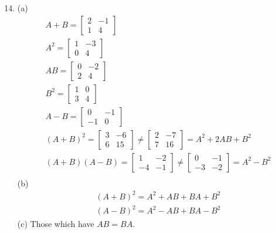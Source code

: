 \documentclass[a4paper, 12pt]{article}
\begin{document}
\begin{enumerate}
		\setcounter{enumi}{13}
		\item (a)
		\begin{gather*}
		A + B = \left[ \begin{array}{cc}
		2 & -1 \\
		1 & 4 \end{array} \right] \\
		A^2 = \left[ \begin{array}{cc}
		1 & -3 \\
		0 & 4 \end{array} \right] \\
		AB = \left[ \begin{array}{cc}
		0 & -2 \\
		2 & 4 \end{array} \right] \\
		B^2 = \left[ \begin{array}{cc}
		1 & 0 \\
		3 & 4 \end{array} \right] \\
		A - B = \left[ \begin{array}{cc}
		0 & -1 \\
		-1 & 0 \end{array} \right] \\
		(A + B)^2 = \left[ \begin{array}{cc}
		3 & -6 \\
		6 & 15 \end{array} \right]
		\neq \left[ \begin{array}{cc}
		2 & -7 \\
		7 & 16 \end{array} \right] = A^2 + 2AB + B^2 \\
		(A + B)(A - B) = \left[ \begin{array}{cc}
		1 & -2 \\
		-4 & -1 \end{array} \right]
		\neq \left[ \begin{array}{cc}
		0 & -1 \\
		-3 & -2 \end{array} \right] = A^2 - B^2 \\
		\end{gather*}
		(b)
		\begin{gather*}
		(A + B)^2 = A^2 + AB + BA + B^2 \\
		(A - B)^2 = A^2 - AB + BA - B^2
		\end{gather*}
		(c) Those which have $AB = BA$.
		

\end{enumerate}
\end{document}
